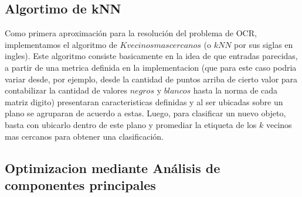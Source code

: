 \subsection{Algortimo de kNN}
Como primera aproximaci\'on para la resoluci\'on del problema de OCR, implementamos el algoritmo de $K vecinos mas cercanos$ (o $kNN$ por sus siglas en ingles). Este algoritmo consiste basicamente en la idea de que entradas parecidas, a partir de una metrica definida en la implementacion (que para este caso podria variar desde, por ejemplo, desde la cantidad de puntos arriba de cierto valor para contabilizar la cantidad de valores $negros$ y $blancos$ hasta la norma de cada matriz digito) presentaran caracteristicas definidas y al ser ubicadas sobre un plano se agruparan de acuerdo a estas. Luego, para clasificar un nuevo objeto, basta con ubicarlo dentro de este plano y promediar la etiqueta de los $k$ vecinos mas cercanos para obtener una clasificaci\'on.

\subsection{Optimizacion mediante An\'alisis de componentes principales}
